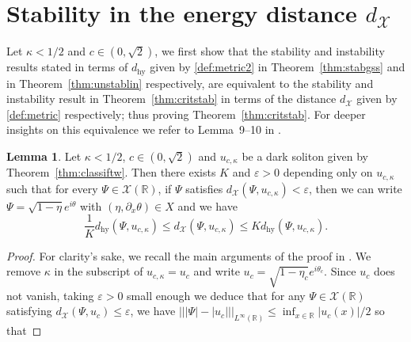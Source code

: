 \documentclass[11pt]{article}
\newcommand{\R}{\mathbb{R}}
\theoremstyle{plain}
\theoremstyle{definition}
\newtheorem{lemma}{Lemma}
\theoremstyle{remark}
\numberwithin{equation}{section}
\begin{document}
{	%
	\section{Stability in the energy distance $d_\mathcal{X}$}\label{sec:equiv}
	Let $\kappa<1/2$ and $c\in(0,\sqrt2)$, we first show that the stability and instability results stated in terms of $d_{\mathrm{hy}}$ given by \eqref{def:metric2} in Theorem~\ref{thm:stabgss} and in Theorem~\ref{thm:unstablin} respectively, are equivalent to the stability and instability result in Theorem~\ref{thm:critstab} in terms of the distance $d_\mathcal{X}$ given by \eqref{def:metric} respectively; thus proving Theorem~\ref{thm:critstab}. For deeper insights on this equivalence we refer to Lemma~9--10 in \cite{chiron-stability}.
	\begin{lemma}\label{lem:dequiv}
		Let $\kappa<1/2$, $c\in(0,\sqrt{2})$ and $u_{c,\kappa}$ be a dark soliton given by Theorem~\ref{thm:classiftw}. Then there exists $K$ and $\varepsilon>0$ depending only on $u_{c,\kappa}$ such that for every $\Psi\in\mathcal{X}(\R)$, if $\Psi$ satisfies $d_\mathcal{X}(\Psi,u_{c,\kappa})<\varepsilon$, then we can write $\Psi=\sqrt{1-\eta}e^{i\theta}$ with $(\eta,\partial_x\theta)\in X$ and we have
		\begin{equation}
			\frac{1}{K}d_{\mathrm{hy}}(\Psi,u_{c,\kappa})\leq d_{\mathcal{X}}(\Psi,u_{c,\kappa})\leq Kd_{\mathrm{hy}}(\Psi,u_{c,\kappa}).
		\end{equation} 
	\end{lemma}
	\begin{proof}
		For clarity's sake, we recall the main arguments of the proof in \cite{chironstab}.
		We remove $\kappa$ in the subscript of $u_{c,\kappa}=u_c$ and write $u_c=\sqrt{1-\eta_c}e^{i\theta_c}$. Since $u_{c}$ does not vanish, taking $\varepsilon>0$ small enough we deduce that for any $\Psi\in\mathcal{X}(\R)$ satisfying $d_\mathcal{X}(\Psi,u_c)\leq\varepsilon$, we have $|||\Psi|-|u_{c}|||_{ L^\infty(\R)}\leq\inf_{x\in\R}|u_c(x)|/2$ so that 

\end{proof}}
\end{document}
